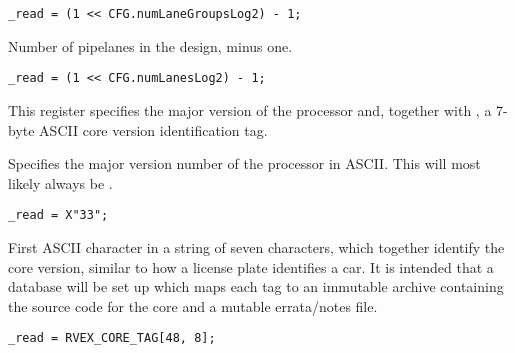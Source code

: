 \reset{****}
\implementation{}
\begin{lstlisting}
_read = (1 << CFG.numLaneGroupsLog2) - 1;
\end{lstlisting}

Number of pipelanes in the design, minus one.

\reset{****}
\implementation{}
\begin{lstlisting}
_read = (1 << CFG.numLanesLog2) - 1;
\end{lstlisting}


This register specifies the major version of the processor and, together with
, a 7-byte ASCII core version identification tag.

Specifies the major version number of the \rvex{} processor in ASCII. This will
most likely always be .

\implementation{}
\begin{lstlisting}
_read = X"33";
\end{lstlisting}

First ASCII character in a string of seven characters, which together identify 
the core version, similar to how a license plate identifies a car. It is 
intended that a database will be set up which maps each tag to an immutable 
archive containing the source code for the core and a mutable errata/notes file.

\implementation{}
\begin{lstlisting}
_read = RVEX_CORE_TAG[48, 8];
\end{lstlisting}

